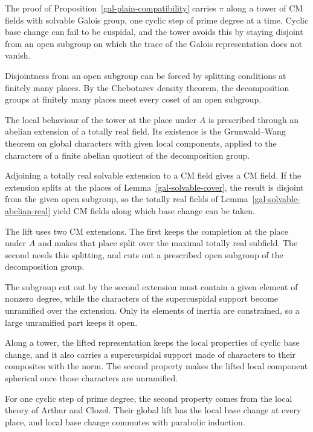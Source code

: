 The proof of Proposition~\ref{gal-plain-compatibility} carries $\pi$ along a tower of CM fields with
solvable Galois group, one cyclic step of prime degree at a time. Cyclic base change can fail to be
cuspidal, and the tower avoids this by staying disjoint from an open subgroup on which the trace of the
Galois representation does not vanish.

Disjointness from an open subgroup can be forced by splitting conditions at finitely many places. By
the Chebotarev density theorem, the decomposition groups at finitely many places meet every coset of an
open subgroup.

The local behaviour of the tower at the place under $A$ is prescribed through an abelian extension of a
totally real field. Its existence is the Grunwald--Wang theorem on global characters with given local
components, applied to the characters of a finite abelian quotient of the decomposition group.

Adjoining a totally real solvable extension to a CM field gives a CM field. If the extension splits at
the places of Lemma~\ref{gal-solvable-cover}, the result is disjoint from the given open subgroup, so
the totally real fields of Lemma~\ref{gal-solvable-abelian-real} yield CM fields along which base change
can be taken.

The lift uses two CM extensions. The first keeps the completion at the place under $A$ and makes that
place split over the maximal totally real subfield. The second needs this splitting, and cuts out a
prescribed open subgroup of the decomposition group.

The subgroup cut out by the second extension must contain a given element of nonzero degree, while the
characters of the supercuspidal support become unramified over the extension. Only its elements of
inertia are constrained, so a large unramified part keeps it open.

Along a tower, the lifted representation keeps the local properties of cyclic base change, and it also
carries a supercuspidal support made of characters to their composites with the norm. The second
property makes the lifted local component spherical once those characters are unramified.

For one cyclic step of prime degree, the second property comes from the local theory of Arthur and
Clozel. Their global lift has the local base change at every place, and local base change commutes with
parabolic induction.

